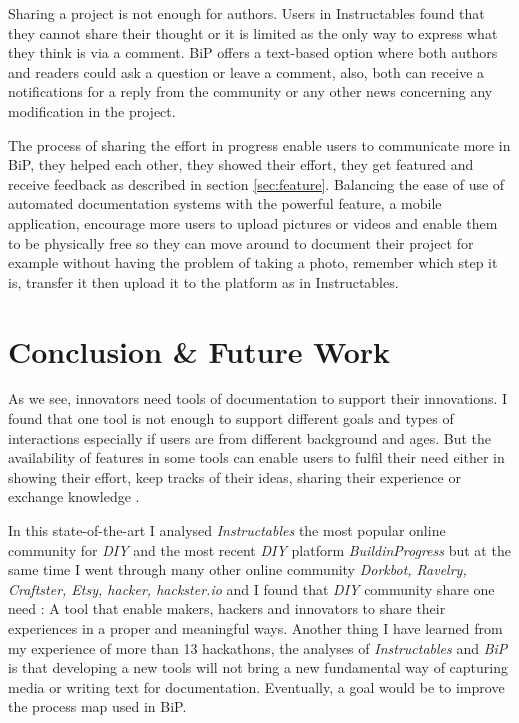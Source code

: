 Sharing a project is not enough for authors. Users in Instructables found that they cannot share their thought or it is limited as the only way to express what they think is via a comment. BiP offers a text-based option where both authors and readers could ask a question or leave a comment, also, both can receive a notifications for a reply from the community or any other news concerning any modification in the project.

The process of sharing the effort in progress enable users to communicate more in BiP, they helped each other, they showed their effort, they get featured and receive feedback as described in section \ref{sec:feature}. Balancing the ease of use of automated documentation systems with the powerful feature, a mobile application, encourage more users to upload pictures or videos and enable them to be physically free so they can move around to document their project for example without having the problem of taking a photo, remember which step it is, transfer it then upload it to the platform as in Instructables.

\section{Conclusion \& Future Work}

As we see, innovators need tools of documentation to support their innovations. I found that one tool is not enough to support different goals and types of interactions especially if users are from different background and ages. But the availability of features in some tools can enable users to fulfil their need either in showing their effort, keep tracks of their ideas, sharing their experience or exchange knowledge \cite{doi:10.1287/orsc.1070.0325}. 

In this state-of-the-art I analysed \textit{Instructables} the most popular online community for \textit{DIY} and the most recent \textit{DIY} platform \textit{BuildinProgress} but at the same time I went through many other online community \textit{Dorkbot, Ravelry, Craftster, Etsy, hacker, hackster.io} and I found that \textit{DIY} community share one need : A tool that enable makers, hackers and innovators to share their experiences in  a proper and meaningful ways.  Another thing I have learned from my experience of more than 13 hackathons, the analyses of \textit{Instructables}  and \textit{BiP} is that developing a new tools will not bring a new fundamental way of capturing media or writing text for documentation. Eventually, a goal would be to improve the process map used in BiP. 

